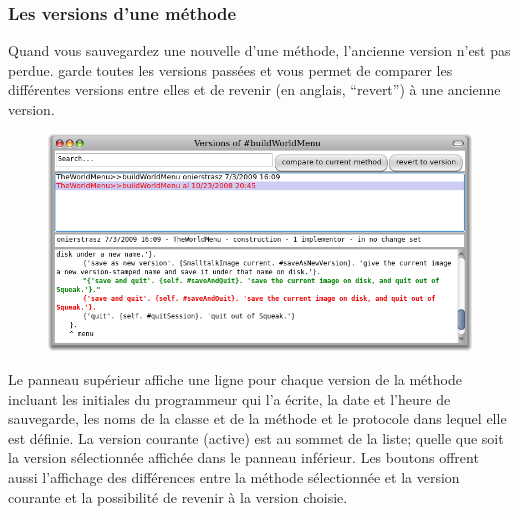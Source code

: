 \documentclass[a4paper,10pt,twoside]{book}
\begin{document}
\subsubsection{Les versions d'une méthode}

Quand vous sauvegardez une nouvelle  d'une méthode,
l'ancienne version n'est pas perdue. \pharo garde toutes les versions passées et vous permet 
de comparer les différentes versions entre elles et de revenir (en anglais, ``revert'') à une ancienne version.
\begin{figure}[btp]
   \centering
	   {\includegraphics[width=\textwidth]{Versions} }
   \caption{}
\end{figure} %




Le panneau supérieur affiche une ligne pour chaque version de la méthode
incluant les initiales du programmeur qui l'a écrite, la date et l'heure de
sauvegarde, les noms de la classe et de la méthode et le protocole dans 
lequel elle est définie.
La version courante (active) est au sommet de la liste; quelle que soit la version
sélectionnée affichée dans le panneau inférieur.
Les boutons offrent aussi l'affichage des différences entre la méthode sélectionnée et la version courante et la possibilité de revenir à la version choisie.  
\end{document}
